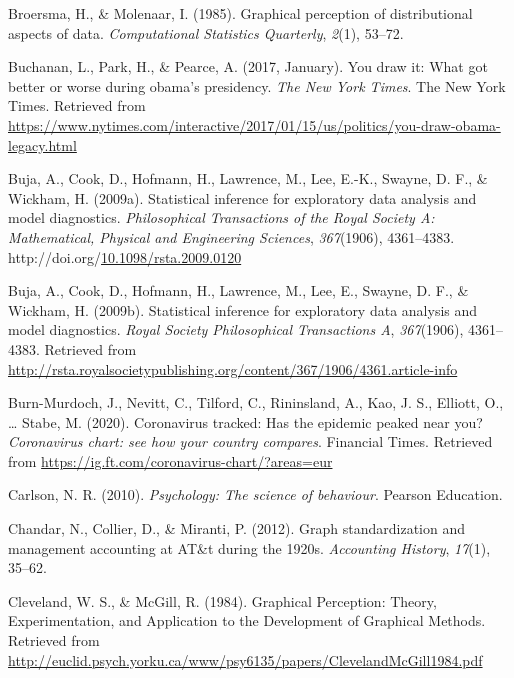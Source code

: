 \documentclass[print]{nuthesis}
\newlength{\cslhangindent}
\newenvironment{CSLReferences}%
{\setlength{\parindent}{0pt}%
\everypar{\setlength{\hangindent}{\cslhangindent}}\ignorespaces}%
{\par}
\begin{document}
\begin{CSLReferences}{1}{0}
\leavevmode{}%
Broersma, H., \& Molenaar, I. (1985). Graphical perception of distributional aspects of data. \emph{Computational Statistics Quarterly}, \emph{2}(1), 53--72.

\leavevmode{}%
Buchanan, L., Park, H., \& Pearce, A. (2017, January). You draw it: What got better or worse during obama's presidency. \emph{The New York Times}. The New York Times. Retrieved from \url{https://www.nytimes.com/interactive/2017/01/15/us/politics/you-draw-obama-legacy.html}

\leavevmode{}%
Buja, A., Cook, D., Hofmann, H., Lawrence, M., Lee, E.-K., Swayne, D. F., \& Wickham, H. (2009a). Statistical inference for exploratory data analysis and model diagnostics. \emph{Philosophical Transactions of the Royal Society A: Mathematical, Physical and Engineering Sciences}, \emph{367}(1906), 4361--4383. http://doi.org/\href{https://doi.org/10.1098/rsta.2009.0120}{10.1098/rsta.2009.0120}

\leavevmode{}%
Buja, A., Cook, D., Hofmann, H., Lawrence, M., Lee, E., Swayne, D. F., \& Wickham, H. (2009b). Statistical inference for exploratory data analysis and model diagnostics. \emph{Royal Society Philosophical Transactions A}, \emph{367}(1906), 4361--4383. Retrieved from \url{http://rsta.royalsocietypublishing.org/content/367/1906/4361.article-info}

\leavevmode{}%
Burn-Murdoch, J., Nevitt, C., Tilford, C., Rininsland, A., Kao, J. S., Elliott, O., \ldots{} Stabe, M. (2020). Coronavirus tracked: Has the epidemic peaked near you? \emph{Coronavirus chart: see how your country compares}. Financial Times. Retrieved from \url{https://ig.ft.com/coronavirus-chart/?areas=eur}

\leavevmode{}%
Carlson, N. R. (2010). \emph{Psychology: The science of behaviour}. Pearson Education.

\leavevmode{}%
Chandar, N., Collier, D., \& Miranti, P. (2012). Graph standardization and management accounting at AT\&t during the 1920s. \emph{Accounting History}, \emph{17}(1), 35--62.

\leavevmode{}%
Cleveland, W. S., \& McGill, R. (1984). Graphical {Perception}: {Theory}, {Experimentation}, and {Application} to the {Development} of {Graphical} {Methods}. Retrieved from \url{http://euclid.psych.yorku.ca/www/psy6135/papers/ClevelandMcGill1984.pdf}


\end{CSLReferences}
\end{document}
